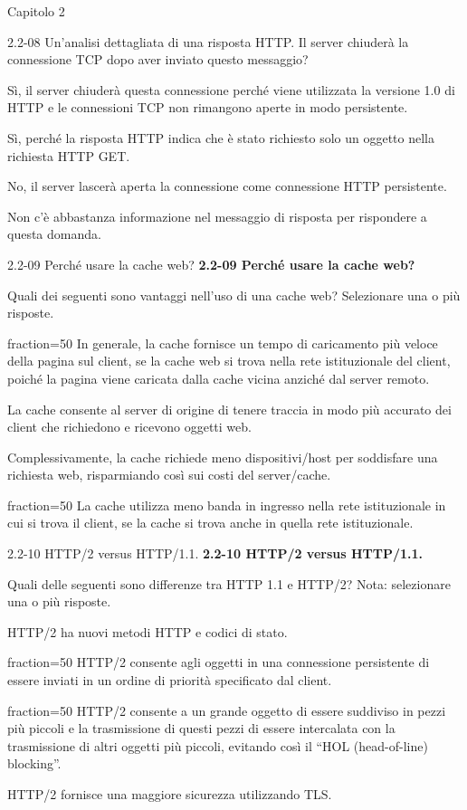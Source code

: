 \documentclass[a4paper]{article}
\begin{document}
\begin{quiz}{Capitolo 2}
\begin{multi}[points=1,shuffle]{2.2-08 Un'analisi dettagliata di una risposta HTTP.}
Il server chiuderà la connessione TCP dopo aver inviato questo messaggio?
\item* Sì, il server chiuderà questa connessione perché viene utilizzata la versione 1.0 di HTTP e le connessioni TCP non rimangono aperte in modo persistente.
\item Sì, perché la risposta HTTP indica che è stato richiesto solo un oggetto nella richiesta HTTP GET.
\item No, il server lascerà aperta la connessione come connessione HTTP persistente.
\item Non c'è abbastanza informazione nel messaggio di risposta per rispondere a questa domanda.
\end{multi}
            
\begin{multi}[points=1,shuffle,multiple]{2.2-09 Perché usare la cache web?}
\textbf{2.2-09 Perché usare la cache web?}

Quali dei seguenti sono vantaggi nell'uso di una cache web? Selezionare una o più risposte.

\item[fraction=50] In generale, la cache fornisce un tempo di caricamento più veloce della pagina sul client, se la cache web si trova nella rete istituzionale del client, poiché la pagina viene caricata dalla cache vicina anziché dal server remoto.
\item La cache consente al server di origine di tenere traccia in modo più accurato dei client che richiedono e ricevono oggetti web.
\item Complessivamente, la cache richiede meno dispositivi/host per soddisfare una richiesta web, risparmiando così sui costi del server/cache.
\item[fraction=50] La cache utilizza meno banda in ingresso nella rete istituzionale in cui si trova il client, se la cache si trova anche in quella rete istituzionale.
\end{multi}
    

\begin{multi}[points=1,shuffle,multiple]{2.2-10 HTTP/2 versus HTTP/1.1.}
\textbf{2.2-10 HTTP/2 versus HTTP/1.1.}

Quali delle seguenti sono differenze tra HTTP 1.1 e HTTP/2? Nota: selezionare una o più risposte.

\item HTTP/2 ha nuovi metodi HTTP e codici di stato.
\item[fraction=50] HTTP/2 consente agli oggetti in una connessione persistente di essere inviati in un ordine di priorità specificato dal client.
\item[fraction=50] HTTP/2 consente a un grande oggetto di essere suddiviso in pezzi più piccoli e la trasmissione di questi pezzi di essere intercalata con la trasmissione di altri oggetti più piccoli, evitando così il ``HOL (head-of-line) blocking''.
\item HTTP/2 fornisce una maggiore sicurezza utilizzando TLS.
\end{multi}
    

\end{quiz}
\end{document}
